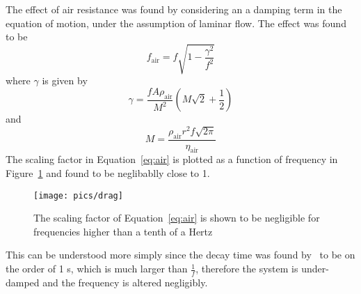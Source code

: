 \documentclass[twoside]{article}
\begin{document}
\begin{multicols}{2}
The effect of air resistance was found by considering an a damping term in the equation of motion, under the assumption of laminar flow.  The effect was found to be
\begin{equation}
f_\text{air} = f\sqrt{1 - \frac{\gamma^2}{f^2}}
\label{eq:air}
\end{equation}
where $\gamma$ is given by
\begin{equation}
\gamma = \frac{f A \rho_\text{air}}{M^2} (M  \sqrt{2} +  \frac{1}{2}  )
\end{equation}
and 
\begin{equation}
M = \frac{\rho_\text{air} r^2 f \sqrt{2\pi} }{\eta_\text{air}}
\end{equation}
The scaling factor in Equation~\ref{eq:air} is plotted as a function of frequency in Figure~\ref{fig:drag} and found to be neglibablly close to 1. 
\begin{figure}[H]
	\texttt{[image: pics/drag]}
	\caption{The scaling factor of Equation~\ref{eq:air} is shown to be negligible for frequencies higher than a tenth of a Hertz}
	\label{fig:drag}
\end{figure}
This can be understood more simply since the decay time was found by~\cite{david} to be on the order of 1 s, which is much larger than $\frac{1}{f}$, therefore the system is under-damped and the frequency is altered negligibly. 














\end{multicols}
\end{document}
